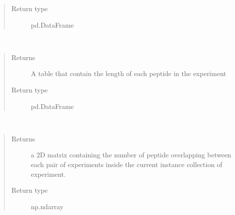 \documentclass[letterpaper,10pt,english]{sphinxmanual}
\begin{document}
\begin{fulllineitems}
\begin{fulllineitems}
\begin{quote}
\begin{description}
\item[{Return type}] \leavevmode
pd.DataFrame

\end{description}\end{quote}

\end{fulllineitems}


\begin{fulllineitems}
\label{\detokenize{IPTK.Classes:IPTK.Classes.ExperimentalSet.ExperimentSet.compute_peptide_length_table}}~\begin{quote}\begin{description}
\item[{Returns}] \leavevmode
A table that contain the length of each peptide in the experiment

\item[{Return type}] \leavevmode
pd.DataFrame

\end{description}\end{quote}

\end{fulllineitems}


\begin{fulllineitems}
\label{\detokenize{IPTK.Classes:IPTK.Classes.ExperimentalSet.ExperimentSet.compute_peptide_overlap_matrix}}~\begin{quote}\begin{description}
\item[{Returns}] \leavevmode
a 2D matrix containing the number of peptide overlapping between each pair of experiments inside the current instance collection of experiment.

\item[{Return type}] \leavevmode
np.ndarray


\end{description}
\end{quote}
\end{fulllineitems}
\end{fulllineitems}
\end{document}
